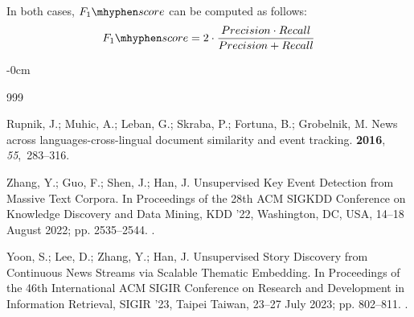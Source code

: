 \documentclass[make,article,accept,pdftex,moreauthors]{Definitions/mdpi}
\begin{document}
In both cases, $F_1\mhyphen score$ can be computed as follows:
\begin{equation}
  F_1\mhyphen score = 2  \cdot \frac{Precision \cdot Recall}{Precision +  Recall}
\end{equation}


\begin{adjustwidth}{-\extralength}{0cm}


% 
%
\begin{thebibliography}{999}

Rupnik, J.; Muhic, A.; Leban, G.; Skraba, P.; Fortuna, B.; Grobelnik, M.
\newblock News across languages-cross-lingual document similarity and event
  tracking.
 {\bf 2016}, {\em
  55},~283--316.

Zhang, Y.; Guo, F.; Shen, J.; Han, J.
\newblock Unsupervised Key Event Detection from Massive Text Corpora.
\newblock In Proceedings of the 28th ACM SIGKDD Conference
  on Knowledge Discovery and Data Mining, KDD '22, Washington, DC, USA, 14--18 August
 2022; pp.
  2535--2544.
.

Yoon, S.; Lee, D.; Zhang, Y.; Han, J.
\newblock Unsupervised Story Discovery from Continuous News Streams via
  Scalable Thematic Embedding.
\newblock In Proceedings of the 46th International ACM SIGIR
  Conference on Research and Development in Information Retrieval, SIGIR '23, Taipei Taiwan, 23--27 July 2023; pp. 802--811.
.


\end{thebibliography}
\end{adjustwidth}
\end{document}
